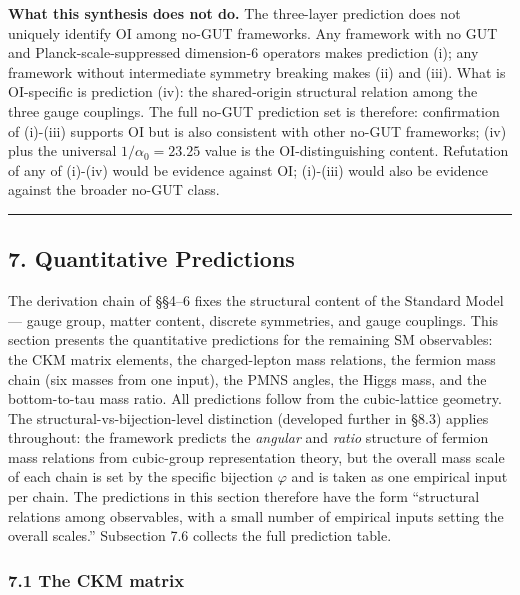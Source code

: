 \documentclass[
]{article}
\begin{document}
\textbf{What this synthesis does not do.} The three-layer prediction
does not uniquely identify OI among no-GUT frameworks. Any framework
with no GUT and Planck-scale-suppressed dimension-6 operators makes
prediction (i); any framework without intermediate symmetry breaking
makes (ii) and (iii). What is OI-specific is prediction (iv): the
shared-origin structural relation among the three gauge couplings. The
full no-GUT prediction set is therefore: confirmation of (i)-(iii)
supports OI but is also consistent with other no-GUT frameworks; (iv)
plus the universal \(1/\alpha_0 = 23.25\) value is the OI-distinguishing
content. Refutation of any of (i)-(iv) would be evidence against OI;
(i)-(iii) would also be evidence against the broader no-GUT class.

\begin{center}\rule{0.5\linewidth}{0.5pt}\end{center}

\hypertarget{quantitative-predictions}{%
\subsection{7. Quantitative
Predictions}\label{quantitative-predictions}}

The derivation chain of §§4--6 fixes the structural content of the
Standard Model --- gauge group, matter content, discrete symmetries, and
gauge couplings. This section presents the quantitative predictions for
the remaining SM observables: the CKM matrix elements, the
charged-lepton mass relations, the fermion mass chain (six masses from
one input), the PMNS angles, the Higgs mass, and the bottom-to-tau mass
ratio. All predictions follow from the cubic-lattice geometry. The
structural-vs-bijection-level distinction (developed further in §8.3)
applies throughout: the framework predicts the \emph{angular} and
\emph{ratio} structure of fermion mass relations from cubic-group
representation theory, but the overall mass scale of each chain is set
by the specific bijection \(\varphi\) and is taken as one empirical
input per chain. The predictions in this section therefore have the form
``structural relations among observables, with a small number of
empirical inputs setting the overall scales.'' Subsection 7.6 collects
the full prediction table.

\hypertarget{the-ckm-matrix}{%
\subsubsection{7.1 The CKM matrix}\label{the-ckm-matrix}}
\end{document}
